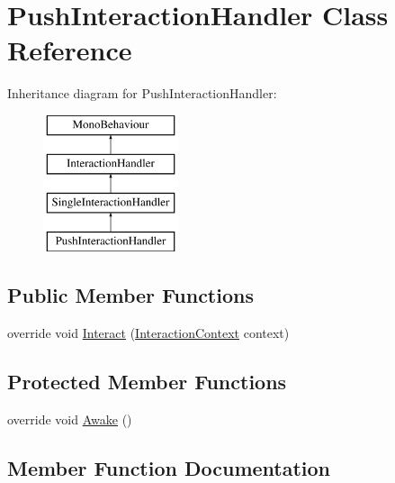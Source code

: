 \hypertarget{class_push_interaction_handler}{}\section{Push\+Interaction\+Handler Class Reference}
\label{class_push_interaction_handler}
Inheritance diagram for Push\+Interaction\+Handler\+:\begin{figure}[H]
\begin{center}
\leavevmode
\includegraphics[height=4.000000cm]{class_push_interaction_handler}
\end{center}
\end{figure}
\subsection*{Public Member Functions}
\begin{DoxyCompactItemize}
\item 
override void \mbox{\hyperlink{class_push_interaction_handler_af820f5de9628e2f527d5d0f35afc01d7}{Interact}} (\mbox{\hyperlink{class_interaction_context}{Interaction\+Context}} context)
\end{DoxyCompactItemize}
\subsection*{Protected Member Functions}
\begin{DoxyCompactItemize}
\item 
override void \mbox{\hyperlink{class_push_interaction_handler_a5e962d17b817f70e1376ca9f3091c326}{Awake}} ()
\end{DoxyCompactItemize}


\subsection{Member Function Documentation}
\mbox{\label{class_push_interaction_handler_a5e962d17b817f70e1376ca9f3091c326}} 

